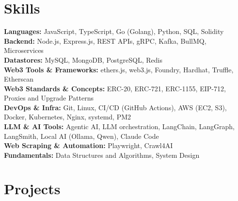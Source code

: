 \documentclass[]{resume-openfont}
\begin{document}
\section{Skills}
\begin{skillList}
    \textbf{Languages:} JavaScript, TypeScript, Go (Golang), Python, SQL, Solidity \\
    \textbf{Backend:} Node.js, Express.js, REST APIs, gRPC, Kafka, BullMQ, Microservices \\
    \textbf{Datastores:} MySQL, MongoDB, PostgreSQL, Redis \\
    \textbf{Web3 Tools \& Frameworks:} ethers.js, web3.js, Foundry, Hardhat, Truffle, Etherscan \\
    \textbf{Web3 Standards \& Concepts:} ERC-20, ERC-721, ERC-1155, EIP-712, Proxies and Upgrade Patterns \\
    \textbf{DevOps \& Infra:} Git, Linux, CI/CD (GitHub Actions), AWS (EC2, S3), Docker, Kubernetes, Nginx, systemd, PM2 \\
    \textbf{LLM \& AI Tools:} Agentic AI, LLM orchestration, LangChain, LangGraph, LangSmith, Local AI (Ollama, Qwen), Claude Code \\
    \textbf{Web Scraping \& Automation:} Playwright, Crawl4AI \\
    \textbf{Fundamentals:} Data Structures and Algorithms, System Design
\end{skillList}


\sectionsep


\section{Projects}
\end{document}
